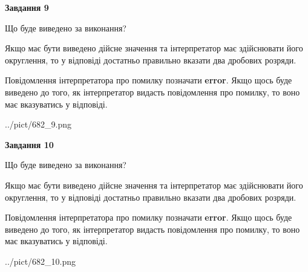 \documentclass[12pt, ukrainian]{article}
\begin{document}
{\begin {Large}
{\begin {center}\textbf{Завдання 9}\end {center}}\par
Що буде виведено за виконання? \par

Якщо має бути виведено дійсне значення та інтерпретатор має здійснювати його округлення, 
то у відповіді достатньо правильно вказати два дробових розряди.

Повідомлення інтерпретатора про помилку позначати \textbf{error}.
Якщо щось буде виведено до того, як інтерпретатор видасть повідомлення про помилку, 
то воно має вказуватись у відповіді. \par

\begin{center}
	{../pict/682_9.png}
\end{center}
\newpage

{\begin {center}\textbf{Завдання 10}\end {center}}\par
Що буде виведено за виконання? \par

Якщо має бути виведено дійсне значення та інтерпретатор має здійснювати його округлення, 
то у відповіді достатньо правильно вказати два дробових розряди.

Повідомлення інтерпретатора про помилку позначати \textbf{error}.
Якщо щось буде виведено до того, як інтерпретатор видасть повідомлення про помилку, 
то воно має вказуватись у відповіді. \par

\begin{center}
	{../pict/682_10.png}
\end{center}
\newpage

\end {Large}}
\end{document}
